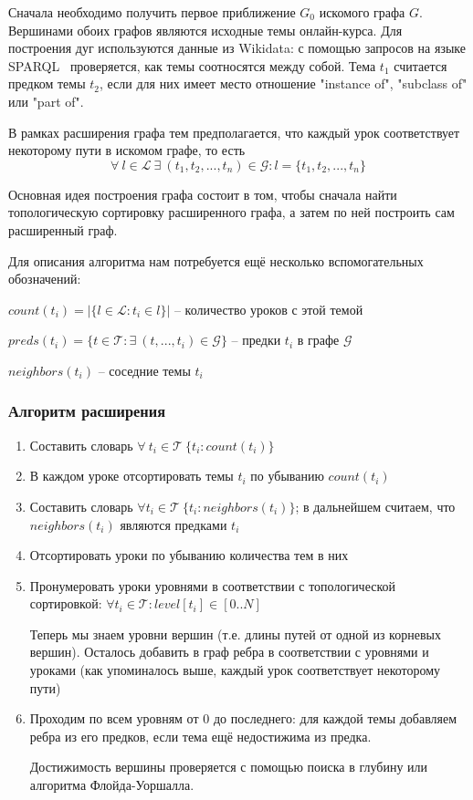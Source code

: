 \documentclass[14pt]{matmex-diploma-custom}
\begin{document}
Сначала необходимо получить первое приближение $G_0$ искомого графа $G$. Вершинами обоих графов являются исходные темы онлайн-курса. Для построения дуг используются данные из Wikidata: с помощью запросов на языке SPARQL~\cite{SPARQL} проверяется, как темы соотносятся между собой. Тема $t_1$ считается предком темы $t_2$, если для них имеет место отношение "instance of", "subclass of" или "part of". 

В рамках расширения графа тем предполагается, что каждый урок соответствует некоторому пути в искомом графе, то есть 
$$\forall~ l \in \mathcal{L} ~\exists~ (t_1, t_2, ..., t_n) \in \mathcal{G} : l = \{t_1, t_2, ..., t_n\}$$

Основная идея построения графа состоит в том, чтобы сначала найти топологическую сортировку расширенного графа, а затем по ней построить сам расширенный граф.

Для описания алгоритма нам потребуется ещё несколько вспомогательных обозначений:

$count(t_i) = |\{l \in \mathcal{L} : t_i \in l \}|$ -- количество уроков с этой темой

$preds(t_i) = \{t \in \mathcal{T} : \exists~ (t, ..., t_i) \in \mathcal{G}\}$ -- предки $t_i$ в графе $\mathcal{G}$

$neighbors(t_i)$ -- соседние темы $t_i$ \\ %

\subsubsection{Алгоритм расширения}

\begin{enumerate}
    \item Составить словарь $\forall~ t_i \in \mathcal{T}~ \{ t_i: count(t_i) \}$
    
    \item В каждом уроке отсортировать темы $t_i$ по убыванию $count(t_i)$
    
    \item Составить словарь $\forall t_i \in \mathcal{T}~ \{ t_i: neighbors(t_i) \}$; в дальнейшем считаем, что $neighbors(t_i)$ являются предками $t_i$
    \item Отсортировать уроки по убыванию количества тем в них
    
    \item Пронумеровать уроки уровнями в соответствии с топологической сортировкой: $\forall t_i \in \mathcal{T}: level[t_i] \in [0..N]$
    
    Теперь мы знаем уровни вершин (т.е. длины путей от одной из корневых вершин).
    Осталось добавить в граф ребра в соответствии с уровнями и уроками (как упоминалось выше, каждый урок соответствует некоторому пути)
    
    \item Проходим по всем уровням от 0 до последнего:
    для каждой темы добавляем ребра из его предков, если тема ещё недостижима из предка.
    
    Достижимость вершины проверяется с помощью поиска в глубину или алгоритма Флойда-Уоршалла.
\end{enumerate}
\end{document}
